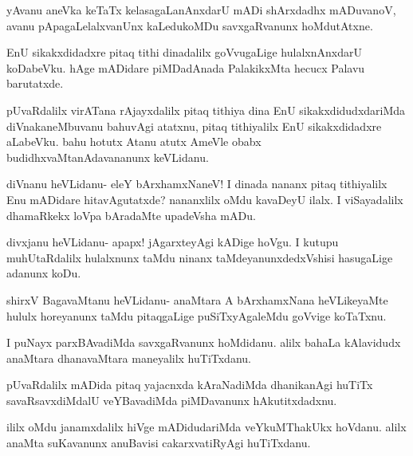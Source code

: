 \documentclass{article}
\begin{document}
\begin{mng}%
yAvanu aneVka keTaTx kelasagaLanAnxdarU mADi shArxdadhx
mADuvanoV, avanu pApagaLelalxvanUnx kaLedukoMDu savxgaRvanunx hoMdutAtxne.
\end{mng}

\begin{mng}%
EnU sikakxdidadxre pitaq tithi dinadalilx goVvugaLige hulalxnAnxdarU
koDabeVku. hAge mADidare piMDadAnada PalakikxMta hecucx Palavu
barutatxde.
\end{mng}

\begin{mng}%
pUvaRdalilx virATana rAjayxdalilx pitaq tithiya dina EnU sikakxdidudxdariMda
diVnakaneMbuvanu bahuvAgi atatxnu, pitaq tithiyalilx EnU sikakxdidadxre
aLabeVku. bahu hotutx Atanu atutx AmeVle obabx budidhxvaMtanAdavananunx
keVLidanu.
\end{mng}

\begin{mng}%
diVnanu heVLidanu- eleY bArxhamxNaneV! I dinada nananx pitaq
tithiyalilx Enu mADidare hitavAgutatxde? nananxlilx oMdu kavaDeyU ilalx.
I viSayadalilx dhamaRkekx loVpa bAradaMte upadeVsha mADu.
\end{mng}

\begin{mng}%
divxjanu heVLidanu- apapx! jAgarxteyAgi kADige hoVgu.
I kutupu muhUtaRdalilx hulalxnunx taMdu ninanx taMdeyanunxdedxVshisi hasugaLige
adanunx koDu.
\end{mng}

\begin{mng}%
shirxV BagavaMtanu heVLidanu- anaMtara A bArxhamxNana heVLikeyaMte
hululx horeyanunx taMdu pitaqgaLige puSiTxyAgaleMdu goVvige
koTaTxnu.
\end{mng}

\begin{mng}%
I puNayx parxBAvadiMda savxgaRvanunx hoMdidanu. alilx bahaLa
kAlavidudx anaMtara dhanavaMtara maneyalilx huTiTxdanu.
\end{mng}

\begin{mng}%
pUvaRdalilx mADida pitaq yajacnxda kAraNadiMda dhanikanAgi
huTiTx savaRsavxdiMdalU veYBavadiMda piMDavanunx hAkutitxdadxnu.
\end{mng}

\begin{mng}%
ililx oMdu janamxdalilx hiVge mADidudariMda veYkuMThakUkx
hoVdanu. alilx anaMta suKavanunx anuBavisi cakarxvatiRyAgi huTiTxdanu.
\end{mng}
\end{document}
